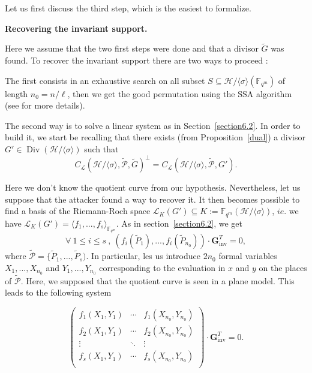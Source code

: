 \documentclass[10pt]{article}
\theoremstyle{definition}
\theoremstyle{definition}
\theoremstyle{definition}
\newcommand{\s}{\vspace{0.3cm}}
\newcommand{\cd}{\cdot}
\newcommand{\fqm}{\mathbb{F}_{q^m}}
\newcommand{\su}{\subseteq}
\newcommand{\PR}{\mathcal{P}}
\newcommand{\Div}{\operatorname{Div}}
\newcommand{\calL}{\mathcal{L}}
\begin{document}
Let us first discuss the third step, which is the easiest to formalize.

\s

\textbf{Recovering the invariant support.}

\s

Here we assume that the two first steps were done and that a divisor $\tilde{G}$ was found. To recover the invariant support there are two ways to proceed :

\s

The first consists in an exhaustive search on all subset $S \su \mathcal{H}/\langle \sigma \rangle\left(\fqm\right)$ of length $n_0=n/\ell$, then we get the good permutation using the SSA algorithm (see \cite{SSA} for more details).

\s

The second way is to solve a linear system as in Section~\ref{section6.2}. In order to build it, we start be recalling that there exists (from Proposition~\ref{dual}) a divisor $G' \in  \Div(\mathcal{H}/\langle \sigma \rangle)$ such that 
\[ C_{\calL}(\mathcal{H}/\langle \sigma \rangle,\tilde{\PR},\tilde{G})^{\perp} = C_{\calL}(\mathcal{H}/\langle \sigma \rangle,\tilde{\PR},G').\]

Here we don't know the quotient curve from our hypothesis. Nevertheless, let us suppose that the attacker found a way to recover it. It then becomes possible to find a basis of  the Riemann-Roch space $\calL_K(G') \su K:=\fqm(\mathcal{H}/\langle \sigma \rangle)$,
$\mathit{ie.}$ we have $\calL_K(G') = \langle f_1,...,f_s \rangle_{\fqm}$. As in section~\ref{section6.2}, we get
\begin{equation*}
\forall \ 1 \leq i \leq s \ , \ (f_i(\tilde{P}_1),...,f_i(\tilde{P}_{n_0})) \cd \mathbf{G}_{\mathrm{inv}}^T = 0,
\end{equation*}
where $\tilde{\PR} = \{\tilde{P}_1,...,\tilde{P}_s)$. In particular, les us introduce $2n_0$ formal variables $X_1,...,X_{n_0}$ and $Y_1,...,Y_{n_0}$ corresponding to the evaluation in $x$ and $y$ on the places of $\tilde{\PR}$. Here, we supposed that the quotient curve is seen in a plane model. This leads to the following system

\begin{equation*}
\begin{pmatrix}
f_1(X_1,Y_1) & \cdots & f_1(X_{n_0},Y_{n_0}) \\
f_2(X_1,Y_1) & \cdots & f_2(X_{n_0},Y_{n_0}) \\
\vdots & \ddots & \vdots \\
f_s(X_1,Y_1) & \cdots & f_s(X_{n_0},Y_{n_0}) \\
\end{pmatrix}
\cd \mathbf{G}_{\mathrm{inv}}^T = 0.
\end{equation*}
\end{document}
